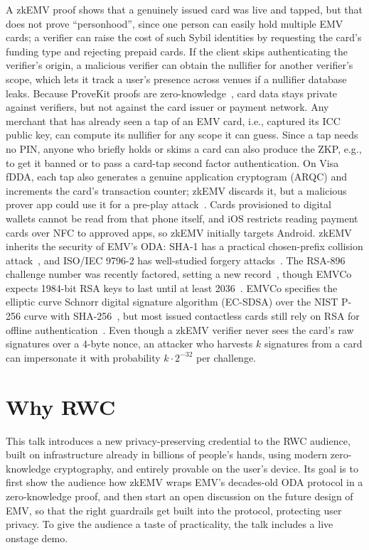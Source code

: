 \documentclass[10pt,a4paper]{article}
\begin{document}
A zkEMV proof shows that a genuinely issued card was live and tapped, but that does not prove ``personhood'', since one person can easily hold multiple EMV cards; a verifier can raise the cost of such Sybil identities by requesting the card's funding type and rejecting prepaid cards.
If the client skips authenticating the verifier's origin, a malicious verifier can obtain the nullifier for another verifier's scope, which lets it track a user's presence across venues if a nullifier database leaks.
Because ProveKit proofs are zero-knowledge~\cite{world-provekit}, card data stays private against verifiers, but not against the card issuer or payment network.
Any merchant that has already seen a tap of an EMV card, i.e., captured its ICC public key, can compute its nullifier for any scope it can guess.
Since a tap needs no PIN, anyone who briefly holds or skims a card can also produce the ZKP, e.g., to get it banned or to pass a card-tap second factor authentication.
On Visa fDDA, each tap also generates a genuine application cryptogram (ARQC) and increments the card's transaction counter; zkEMV discards it, but a malicious prover app could use it for a pre-play attack~\cite{DBLP:conf/sp/BondCMSA14}.
Cards provisioned to digital wallets cannot be read from that phone itself, and iOS restricts reading payment cards over NFC to approved apps, so zkEMV initially targets Android.
zkEMV inherits the security of EMV's ODA: SHA-1 has a practical chosen-prefix collision attack~\cite{DBLP:conf/uss/LeurentP20}, and ISO/IEC 9796-2 has well-studied forgery attacks~\cite{DBLP:conf/crypto/CoronNTW09}.
The RSA-896 challenge number was recently factored, setting a new record~\cite{weis-rsa896}, though EMVCo expects 1984-bit RSA keys to last until at least 2036~\cite{emvco-kl30}.
EMVCo specifies the elliptic curve Schnorr digital signature algorithm (EC-SDSA) over the NIST P-256 curve with SHA-256~\cite{emv-c8,emv-book-e}, but most issued contactless cards still rely on RSA for offline authentication~\cite{emvco-quantum}.
Even though a zkEMV verifier never sees the card's raw signatures over a 4-byte nonce, an attacker who harvests $k$ signatures from a card can impersonate it with probability $k \cdot 2^{-32}$ per challenge.

\section{Why RWC}

This talk introduces a new privacy-preserving credential to the RWC audience, built on infrastructure already in billions of people's hands, using modern zero-knowledge cryptography, and entirely provable on the user's device.
Its goal is to first show the audience how zkEMV wraps EMV's decades-old ODA protocol in a zero-knowledge proof, and then start an open discussion on the future design of EMV, so that the right guardrails get built into the protocol, protecting user privacy.
To give the audience a taste of practicality, the talk includes a live onstage demo.

{\footnotesize


}
\end{document}

